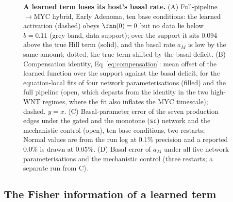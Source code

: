 \begin{figure}[tbp]
\centering
{}
\caption{\textbf{A learned term loses its host's basal rate.} (A) Full-pipeline
\bcat{}$\to$MYC hybrid, Early Adenoma, ten base conditions: the learned
activation (dashed) obeys $\fnn(0)=0$ but no data lie below $b=0.11$ (grey band,
data support); over the support it sits 0.094 above the true Hill term (solid),
and the basal rate $a_M$ is low by the same amount; dotted, the true term
shifted by the basal deficit. (B) Compensation identity,
Eq~\eqref{eq:compensation}: mean offset of the learned function over the support
against the basal deficit, for the equation-local fits of four network
parameterisations (filled) and the full pipeline (open, which departs from the
identity in the two high-WNT regimes, where the fit also inflates the MYC
timescale); dashed, $y=x$. (C) Basal-parameter error of the seven production
edges under the gated and the monotone (\texttt{sc}) network and the
mechanistic control (open), ten base conditions, two restarts; Normal values
are from the run log at 0.1\% precision and a reported 0.0\% is drawn at
0.05\%. (D) Basal error of $a_M$ under all five network parameterisations and
the mechanistic control (three restarts; a separate run from C).}
\label{fig:learned}
\end{figure}

\subsection{The Fisher information of a learned term}
\label{sec:res-hfim}

